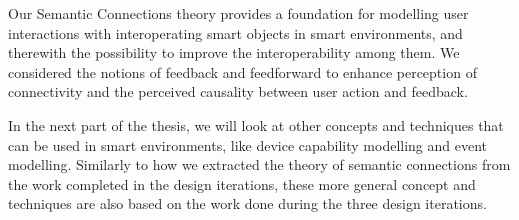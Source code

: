 Our Semantic Connections theory provides a foundation for modelling user interactions with interoperating smart objects in smart environments, and therewith the possibility to improve the interoperability among them. We considered the notions of feedback and feedforward to enhance perception of connectivity and the perceived causality between user action and feedback.   

In the next part of the thesis, we will look at other concepts and techniques that can be used in smart environments, like device capability modelling and event modelling. Similarly to how we extracted the theory of semantic connections from the work completed in the design iterations, these more general concept and techniques are also based on the work done during the three design iterations.

% 





